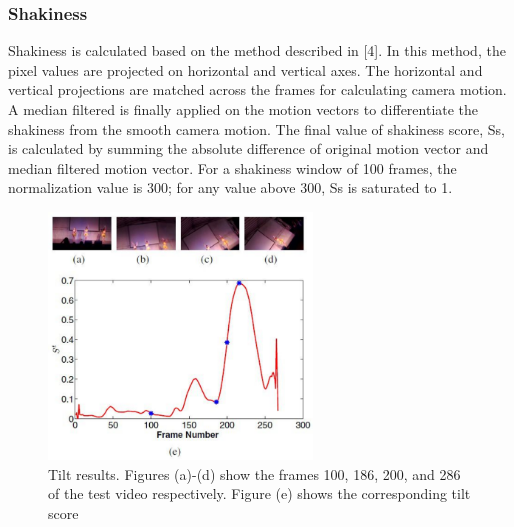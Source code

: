 \documentclass{sig-alternate}
\begin{document}
{{{\subsubsection{Shakiness}
Shakiness is calculated based on the method described in [4].
In this method, the pixel values are projected on horizontal and
vertical axes. The horizontal and vertical projections are matched
across the frames for calculating camera motion. A median filtered
is finally applied on the motion vectors to differentiate the shakiness
from the smooth camera motion. The final value of shakiness
score, Ss, is calculated by summing the absolute difference of original
motion vector and median filtered motion vector.  For a
shakiness window of 100 frames, the normalization value is 300;
for any value above 300, Ss is saturated to 1.

\begin{figure}
    \centering
    \includegraphics[width=70mm]{video_2.pdf}
    \caption{Tilt results. Figures (a)-(d) show the frames 100, 186,
200, and 286 of the test video respectively. Figure (e) shows the
corresponding tilt score}
    \label{fig:my_label}
\end{figure}


}}}
\end{document}
